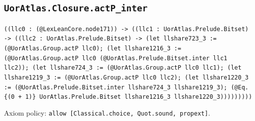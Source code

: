 \documentclass[11pt]{article}
\begin{document}
\subsection*{\texttt{UorAtlas.Closure.actP\_inter}}
\noindent\texttt{((llc0 : (@LexLeanCore.node171)) -> ((llc1 : UorAtlas.Prelude.Bitset) -> ((llc2 : UorAtlas.Prelude.Bitset) -> (let llshare723\_3 := (@UorAtlas.Group.actP llc0); (let llshare1216\_3 := (@UorAtlas.Group.actP llc0 (@UorAtlas.Prelude.Bitset.inter llc1 llc2)); (let llshare724\_3 := (@UorAtlas.Group.actP llc0 llc1); (let llshare1219\_3 := (@UorAtlas.Group.actP llc0 llc2); (let llshare1220\_3 := (@UorAtlas.Prelude.Bitset.inter llshare724\_3 llshare1219\_3); (@Eq.\{(0 + 1)\} UorAtlas.Prelude.Bitset llshare1216\_3 llshare1220\_3)))))))))}\par
\noindent Axiom policy: \texttt{allow [Classical.choice, Quot.sound, propext]}.\par
\end{document}
